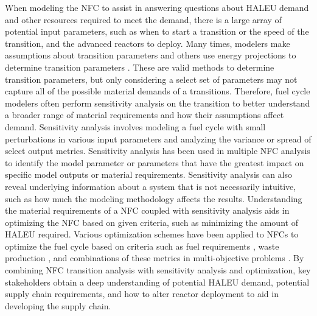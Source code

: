 When modeling the \gls{NFC} to assist in answering questions about 
\gls{HALEU} demand and other resources required to meet the demand, 
there is a large array of potential 
input parameters, such as when to start a transition or the speed of the 
transition, and the advanced reactors to deploy. Many times, modelers make 
assumptions about transition parameters \cite{djokic_application_2015,sunny_transition_2015}
and others use energy projections to determine transition parameters 
\cite{dixon_estimated_2022}. These are valid methods to determine 
transition parameters, but only considering a select set of parameters may 
not capture all of the possible material demands of a transitions. 
Therefore, fuel cycle modelers often perform sensitivity analysis on 
the transition to better understand a broader range of material 
requirements and how their assumptions affect demand. 
Sensitivity analysis involves 
modeling a fuel cycle with small perturbations in various input 
parameters and analyzing the variance or spread of select output metrics. 
Sensitivity analysis has been used in multiple \gls{NFC} analysis 
\cite{chee_sensitivity_2019,feng_sensitivity_2020,thiolliere_methodology_2018,passerini_sensitivity_2012}
to identify the model parameter or parameters that have the greatest 
impact on specific model outputs or material requirements. Sensitivity 
analysis can also reveal underlying information about a system that is not 
necessarily intuitive, such as how much the modeling methodology 
affects the results. Understanding the 
material requirements of a \gls{NFC} coupled with sensitivity analysis 
aids in optimizing the \gls{NFC} based on given criteria, such as 
minimizing the amount of \gls{HALEU} required. Various 
optimization schemes have been applied to \glspl{NFC} to optimize the fuel 
cycle based on criteria such as fuel requirements \cite{kim_selection_1999},
waste production \cite{shwageraus_optimization_2003}, and combinations 
of these metrics in multi-objective 
problems \cite{passerini_systematic_2014}. By combining \gls{NFC} transition 
analysis with sensitivity analysis and optimization, key stakeholders obtain 
a deep understanding of potential \gls{HALEU} demand, potential supply 
chain requirements, and how to alter reactor deployment to aid in developing 
the supply chain. 


